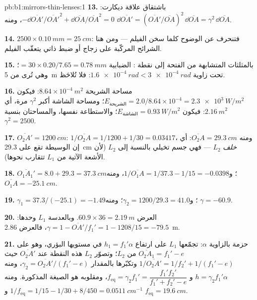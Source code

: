 \begin{solution}{pb:b1:mirrors-thin-lenses:1}
\textbf{13.} باشتقاق علاقة ديكارت: $-\dd\overline{OA'}/\overline{OA'}^2
+ \dd\overline{OA}/\overline{OA}^2 = 0$، ومنه $\dd\overline{OA'} =
(\overline{OA'}/\overline{OA})^2\,\dd\overline{OA} = \gamma^2\,\dd\overline{OA}$.

\textbf{14.} $2500 \times \qty{0.10}{mm} = \qty{25}{cm}$: فتنحرف 
عن الوضوح كلما سخن الفيلم --- ومن هنا الشرائح المركّبة على زجاج أو
ضبط ذاتي يتعقّب الفيلم.

\textbf{15.} بالمثلثات المتشابهة من الفتحة إلى نقطة :
الضبابية $= 30 \times 0.20/7.65 = \qty{0.78}{mm}$؛ وهي تُرى من \qty{5}{m}
تحت زاوية $\qty{1.6e-4}{rad} < \qty{3e-4}{rad}$: فلا تُلاحَظ.

\textbf{16.} مساحة الشريحة $8.64\times10^{-4}\ \unit{m^2}$: فيكون $E_{\text{الشريحة}}
= 2.0/8.64\times10^{-4} = \qty{2.3e3}{W/m^2}$؛ ومساحة الشاشة أكبر $\gamma^2$
مرة، أي $\qty{2.16}{m^2}$: فيكون $E_{\text{الشاشة}} = \qty{0.93}{W/m^2}$؛
والاستطاعة نفسها، والمساحتان بنسبة $\gamma^2 = 2500$.

\textbf{17.} $\overline{O_2A'} = \qty{1200}{cm}$: $1/\overline{O_2A} =
1/1200 + 1/30 = 0.03417$، ومنه $\overline{O_2A} = \qty{+29.3}{cm}$: أي إن
 الوسيطة تقع على \qty{29.3}{cm} \emph{خلف} $L_2$ --- فهي جسم
تخيلي بالنسبة إلى $L_2$ (لأن الأشعة الآتية من $L_1$ تتقارب نحوها).

\textbf{18.} $\overline{O_1A_1'} = 8.0 + 29.3 = \qty{37.3}{cm}$؛
و$1/\overline{O_1A} = 1/37.3 - 1/15 = -0.0398$، ومنه $\overline{O_1A} =
\qty{-25.1}{cm}$.

\textbf{19.} $\gamma_1 = 37.3/(-25.1) = -1.49$؛ و$\gamma_2 = 1200/29.3 =
41.0$؛ ومنه $\gamma = -60.9$.

\textbf{20.} العرض $60.9 \times 36 = \qty{2.19}{m}$. وبالعدسة $L_1$ وحدها:
$\gamma = 1 - \overline{OA'}/f_1' = 1 - 1208/15 = -79.5$، فالعرض
\qty{2.86}{m}.

\textbf{21.} حزمة بالزاوية $\alpha$: تجمّعها $L_1$ على ارتفاع $h_1 = f_1'\alpha$
في مستويها البؤري، وهو على $\overline{O_2A_1} = f_1' - e$ من $L_2$؛
وتصوّر $L_2$ هذه النقطة عند $\overline{O_2A'}$ حيث $1/\overline{O_2A'}
= 1/f_2' + 1/(f_1' - e)$ وتكبّرها بالمقدار $\gamma_2 = \overline{O_2A'}/(f_1'
- e)$، ومنه $h = \gamma_2 f_1'\alpha$ و $f_{\mathrm{eq}} = \gamma_2 f_1'
= \dfrac{f_1' f_2'}{f_1' + f_2' - e}$، ومقلوبه هو الصيغة
المذكورة. ومنه $1/f_{\mathrm{eq}} = 1/15 - 1/30 + 8/450 = \qty{0.0511}{cm^{-1}}$ و
$f_{\mathrm{eq}} = \qty{19.6}{cm}$.


\end{solution}
